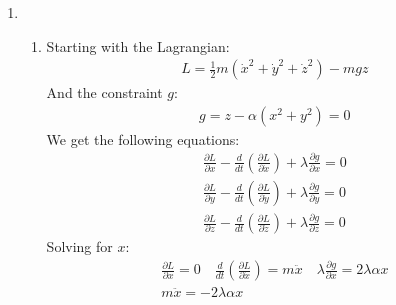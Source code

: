 \documentclass[12pt]{article}
\newcommand{\p}[2]{\frac{\partial #1}{\partial #2}}
\newcommand{\der}[2]{\frac{d #1}{d #2}}
\begin{document}
\begin{enumerate}
\begin{enumerate}
      \item
      \begin{gather}
        \der{}{t}\left(\p{L}{\dot{s}}\right)-\p{L}{s}=0\\
        \der{}{t}\left(\p{L}{\dot{s}}\right)=\der{}{t}\left(2m\dot{s}\right)=2m\ddot{s}\\
        \p{L}{s}=-\frac{1}{2}k\left( 2s-2a \right)+mg\\
        2m\ddot{s}+k(s-a) \right)-mg=0\\
        s(t)=a+c_1\sin\left( \sqrt{\frac{k}{2}}t \right)+c_2\cos\left( \sqrt{\frac{k}{2}}t \right)+\frac{gm}{k}
      \end{gather}
      \item
      The equilibrium position where $\ddot{s}=0$:
      \begin{gather}
        \ddot{s}=\frac{mg-k(s-a)}{2m}
      \end{gather}
      \item
      The frequency is clear from the equations of motion:
      \begin{gather}
        \omega=\frac{k}{2}
      \end{gather}
    \end{enumerate}
    \item
    \begin{enumerate}
      \item Starting with the Lagrangian:
      \begin{gather}
        L=\frac{1}{2}m\left(\dot{x}^2+\dot{y}^2+\dot{z}^2\right)-mgz
      \end{gather}
      And the constraint $g$:
      \begin{gather}
        g=z-\alpha\left( x^2+y^2 \right)=0
      \end{gather}
      We get the following equations:
      \begin{gather}
        \p{L}{x}-\der{}{t}\left(\p{L}{\dot{x}}\right)+\lambda\p{g}{x}=0\\
        \p{L}{y}-\der{}{t}\left(\p{L}{\dot{y}}\right)+\lambda\p{g}{y}=0\\
        \p{L}{z}-\der{}{t}\left(\p{L}{\dot{z}}\right)+\lambda\p{g}{z}=0
      \end{gather}
      Solving for $x$:
      \begin{gather}
        \p{L}{x}=0\quad\der{}{t}\left(\p{L}{\dot{x}}\right)=m\ddot{x}\quad\lambda\p{g}{x}=2\lambda\alpha x\\
        m\ddot{x}=-2\lambda\alpha x\\

\end{gather}
\end{enumerate}
\end{enumerate}
\end{document}
